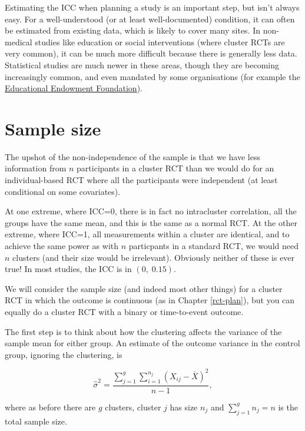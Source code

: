 \documentclass[
  openany]{book}
\theoremstyle{definition}
\theoremstyle{definition}
\theoremstyle{definition}
\theoremstyle{definition}
\theoremstyle{remark}
\begin{document}
Estimating the ICC when planning a study is an important step, but isn't always easy. For a well-understood (or at least well-documented) condition, it can often be estimated from existing data, which is likely to cover many sites. In non-medical studies like education or social interventions (where cluster RCTs are very common), it can be much more difficult because there is generally less data. Statistical studies are much newer in these areas, though they are becoming increasingly common, and even mandated by some organisations (for example the \href{https://educationendowmentfoundation.org.uk}{Educational Endowment Foundation}).

\hypertarget{sample-size}{%
\section{Sample size}\label{sample-size}}

The upshot of the non-independence of the sample is that we have less information from \(n\) participants in a cluster RCT than we would do for an individual-based RCT where all the participants were independent (at least conditional on some covariates).

At one extreme, where ICC=0, there is in fact no intracluster correlation, all the groups have the same mean, and this is the same as a normal RCT. At the other extreme, where ICC=1, all measurements within a cluster are identical, and to achieve the same power as with \(n\) particpants in a standard RCT, we would need \(n\) clusters (and their size would be irrelevant). Obviously neither of these is ever true! In most studies, the ICC is in \(\left(0,\;0.15\right)\).

We will consider the sample size (and indeed most other things) for a cluster RCT in which the outcome is continuous (as in Chapter \ref{rct-plan}), but you can equally do a cluster RCT with a binary or time-to-event outcome.

The first step is to think about how the clustering affects the variance of the sample mean for either group. An estimate of the outcome variance in the control group, ignoring the clustering, is

\begin{equation}
\hat{\sigma}^2 = \frac{\sum\limits_{j=1}^g\sum\limits_{i=1}^{n_j}\left(X_{ij} - \bar{X}\right)^2}{n-1},
\label{eq:varcrt1}
\end{equation}

where as before there are \(g\) clusters, cluster \(j\) has size \(n_j\) and \(\sum\limits_{j=1}^gn_j=n\) is the total sample size.
\end{document}
